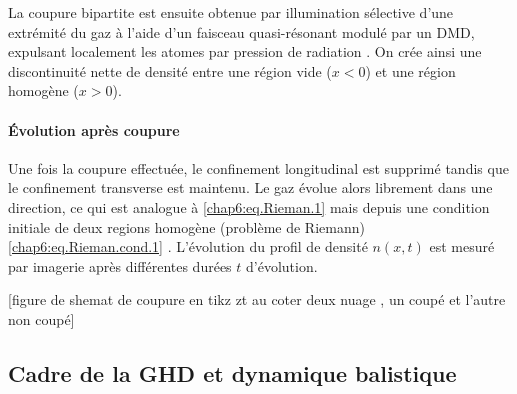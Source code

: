 \medskip 

La coupure bipartite est ensuite obtenue par illumination sélective d’une extrémité du gaz à l’aide d’un faisceau quasi-résonant modulé par un \gls{DMD}, expulsant localement les atomes par pression de radiation \cite{PhysRevLett.133.113402}. On crée ainsi une discontinuité nette de densité entre une région vide ($x<0$) et une région homogène ($x>0$).  


\paragraph{Évolution après coupure}
Une fois la coupure effectuée, le confinement longitudinal est supprimé tandis que le confinement transverse est maintenu. Le gaz évolue alors librement dans une direction, ce qui est analogue  à  \eqref{chap6:eq.Rieman.1} mais depuis une condition initiale de deux regions homogène (problème de Riemann) \eqref{chap6:eq.Rieman.cond.1} . L’évolution du profil de densité $n(x,t)$ est mesuré par imagerie après différentes durées $t$ d’évolution.

\begin{center}
	[figure de shemat de coupure en tikz zt au coter deux nuage , un coupé et l'autre non coupé]	
\end{center}





\subsection{Cadre de la GHD et dynamique balistique}
\label{sec.GHDpredictions}\label{sec:ghd}\label{chap6:sec:ghd}



